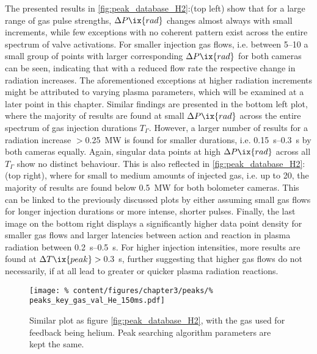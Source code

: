     The presented results in \cref{fig:peak_database_H2}:(top left) show that for a large range of gas pulse strengths, $\Delta P\ix{rad}$ changes almost always with small increments, while few exceptions with no coherent pattern exist across the entire spectrum of valve activations. For smaller injection gas flows, i.e. between \SIrange{5}{10}{\arbitraryunit} a small group of points with larger corresponding $\Delta P\ix{rad}$ for both cameras can be seen, indicating that with a reduced flow rate the respective change in radiation increases. The aforementioned exceptions at higher radiation increments might be attributed to varying plasma parameters, which will be examined at a later point in this chapter. Similar findings are presented in the bottom left plot, where the majority of results are found at small $\Delta P\ix{rad}$ across the entire spectrum of gas injection durations $T_{\Gamma}$. However, a larger number of results for a radiation increase $>$\SI{0.25}{\mega\watt} is found for smaller durations, i.e. \SIrange{0.15}{0.3}{\second} by both cameras equally. Again, singular data points at high $\Delta P\ix{rad}$ across all $T_{\Gamma}$ show no distinct behaviour. This is also reflected in \cref{fig:peak_database_H2}:(top right), where for small to medium amounts of injected gas, i.e. up to \SI{20}{\arbitraryunit}, the majority of results are found below \SI{0.5}{\mega\watt} for both bolometer cameras. This can be linked to the previously discussed plots by either assuming small gas flows for longer injection durations or more intense, shorter pulses. Finally, the last image on the bottom right displays a significantly higher data point density for smaller gas flows and larger latencies between action and reaction in plasma radiation between \SIrange{0.2}{0.5}{\second}. For higher injection intensities, more results are found at $\Delta T\ix{peak}>$\,\SI{0.3}{\second}, further suggesting that higher gas flows do not necessarily, if at all lead to greater or quicker plasma radiation reactions.\\%
%
    \begin{figure}[t]%
        \centering%
        \texttt{[image: \%
            content/figures/chapter3/peaks/\%
            peaks\_key\_gas\_val\_He\_150ms.pdf]}%
        \caption{Similar plot as figure \cref{fig:peak_database_H2}, with the gas used for feedback being helium. Peak searching algorithm parameters are kept the same.}\label{fig:peak_database_He}%
    \end{figure}%
%
